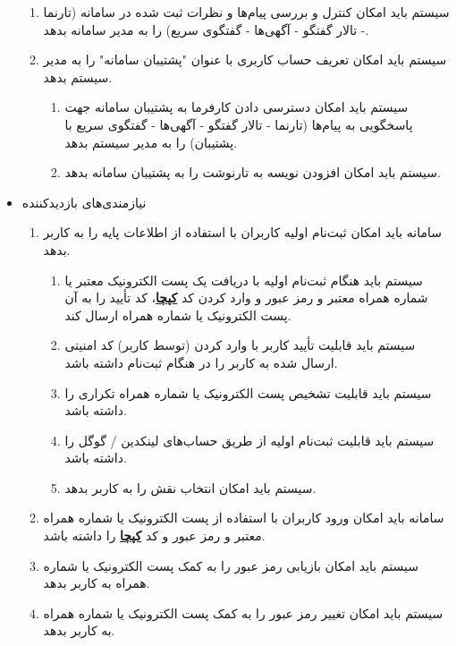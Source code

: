 \documentclass[12pt]{article}
\begin{document}
\begin{itemize}
\begin{enumerate}
			\item سیستم باید امکان کنترل و بررسی پیام‌ها و نظرات ثبت شده در سامانه (تارنما - تالار گفتگو - آگهی‌ها - گفتگوی سریع) را به مدیر سامانه بدهد.
			\item سیستم باید امکان تعریف حساب کاربری با عنوان "پشتیبان سامانه" را به مدیر سیستم بدهد.
			\begin{enumerate}
				\renewcommand{\labelenumii}{-R\arabic{enumi}.\arabic{enumii}}
				\item سیستم باید امکان دسترسی دادن کارفرما به پشتیبان سامانه جهت پاسخگویی به پیام‌ها (تارنما - تالار گفتگو - آگهی‌ها - گفتگوی سریع با پشتیبان) را به مدیر سیستم بدهد.
				\item سیستم باید امکان افزودن نویسه به تارنوشت را به پشتیبان سامانه بدهد.
			\end{enumerate}
		\end{enumerate}
		\item
		نیازمندی‌های بازدید‌کننده
		\begin{enumerate}
			\renewcommand{\labelenumi}{-R\arabic{enumi}}
			\setcounter{enumi}{14}
			\item سامانه باید امکان ثبت‌نام اولیه کاربران با استفاده از اطلاعات پایه را به کاربر بدهد.
			\begin{enumerate}
				\renewcommand{\labelenumii}{-R\arabic{enumi}.\arabic{enumii}}
				\item سیستم باید هنگام ثبت‌نام اولیه با دریافت یک‌ پست الکترونیک معتبر یا شماره همراه معتبر و رمز عبور و وارد کردن کد \textbf{\hyperref[ref:captcha]{کپچا}}، کد تأیید را به آن پست الکترونیک یا شماره همراه ارسال کند.
				\item سیستم باید قابلیت تأیید کاربر با وارد کردن (توسط کاربر) کد امنیتی ارسال شده به کاربر را در هنگام ثبت‌نام داشته باشد.
				\item سیستم باید قابلیت تشخیص پست الکترونیک یا شماره همراه تکراری را داشته باشد.
				\item سیستم باید قابلیت ثبت‌نام اولیه از طریق حساب‌های لینکدین / گوگل را داشته باشد.
				\item سیستم باید امکان انتخاب نقش را به کاربر بدهد.
			\end{enumerate}
			\item سامانه باید امکان ورود کاربران با استفاده از پست الکترونیک یا شماره همراه معتبر و رمز عبور و کد \textbf{\hyperref[ref:captcha]{کپچا}} را داشته باشد.
			\item سیستم باید امکان بازیابی رمز عبور را به کمک پست الکترونیک یا شماره همراه به کاربر بدهد.
			\item سیستم باید امکان تغییر رمز عبور را به کمک پست الکترونیک یا شماره همراه به کاربر بدهد.

\end{enumerate}
\end{itemize}
\end{document}
